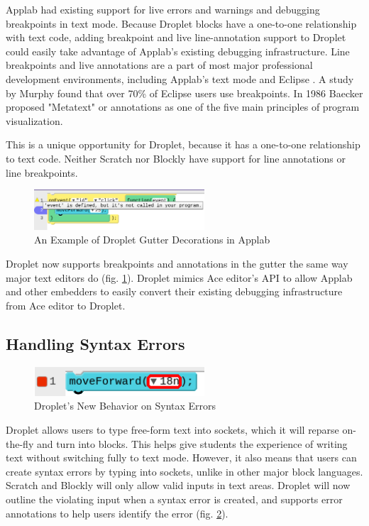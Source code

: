 \documentclass[conference]{IEEEtran}
\begin{document}
Applab had existing support for live errors and warnings and debugging breakpoints in text mode. Because Droplet blocks have a one-to-one relationship with text code, adding breakpoint and live line-annotation support to Droplet could easily take advantage of Applab's existing debugging infrastructure. Line breakpoints and live annotations are a part of most major professional development environments, including Applab's text mode and Eclipse \cite{Eclipse}. A study by Murphy \cite{Murphy} found that over 70\% of Eclipse users use breakpoints. In 1986 Baecker \cite{Baecker} proposed "Metatext" or annotations as one of the five main principles of program visualization.

This is a unique opportunity for Droplet, because it has a one-to-one relationship to text code. Neither Scratch nor Blockly have support for line annotations or line breakpoints.

\begin{figure}
\centering
\includegraphics[width=2.5in]{breakpoint_annotations.png}
\caption{An Example of Droplet Gutter Decorations in Applab}
\label{breakpoints}
\end{figure}

Droplet now supports breakpoints and annotations in the gutter the same way major text editors do (fig. \ref{breakpoints}). Droplet mimics Ace editor's API to allow Applab and other embedders to easily convert their existing debugging infrastructure from Ace editor to Droplet.

\subsection{Handling Syntax Errors}

\begin{figure}
\centering
\includegraphics[width=2.5in]{error-outline.png}
\caption{Droplet's New Behavior on Syntax Errors}
\label{error}
\end{figure}

Droplet allows users to type free-form text into sockets, which it will reparse on-the-fly and turn into blocks. This helps give students the experience of writing text without switching fully to text mode. However, it also means that users can create syntax errors by typing into sockets, unlike in other major block languages. Scratch and Blockly will only allow valid inputs in text areas. Droplet will now outline the violating input when a syntax error is created, and supports error annotations to help users identify the error (fig. \ref{error}).
\end{document}
